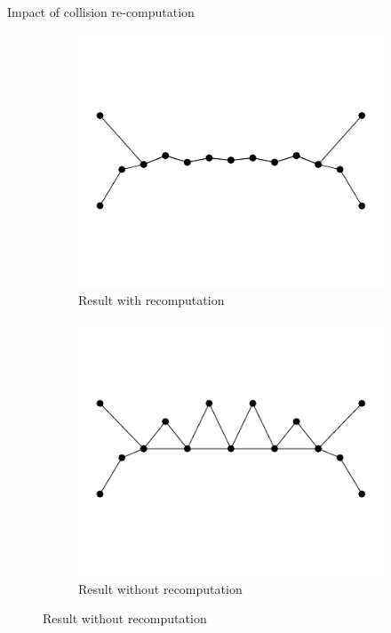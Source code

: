 \documentclass[aspectratio=1610,t,10pt]{beamer}
\begin{document}
\begin{frame}
\begin{columns}[t]
\begin{column}{.48\textwidth}
\begin{block}{Impact of collision re-computation}
\begin{figure}
                \begin{subfigure}[t]{0.48\textwidth}
                    \centering
                    \includegraphics[width=0.8\linewidth]{img/res-collision/disloc-plot-3}
                    \caption{Result with recomputation}
                \end{subfigure}
                \begin{subfigure}[t]{0.48\textwidth}
                    \centering
                    \includegraphics[width=0.8\linewidth]{img/res-collision/disloc-plot-4}
                    \caption{Result without recomputation}
                \end{subfigure}
            \end{figure}
        \end{block}
    \end{column}
\end{columns}
\end{frame}
\end{document}
